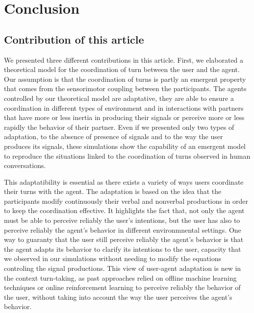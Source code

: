 \section{Conclusion}

\subsection{Contribution of this article}

We presented three different contributions in this article. First, we elaborated a theoretical model for the coordination of turn between the user and the agent. Our assumption is that the coordination of turns is partly an emergent property that comes from the sensorimotor coupling between the participants. 
The agents controlled by our theoretical model are adaptative, they are able to ensure a coordination in different types of environment and in interactions with partners that have more or less inertia in producing their signals or perceive more or less rapidly the behavior of their partner. Even if we presented only two types of adaptation, to the absence of presence of signals and to the way the user produces its signals, these simulations show the capability of an emergent model to reproduce the situations linked to the coordination of turns observed in human conversations.

This adaptatibility is essential as there exists a variety of ways users coordinate their turns with the agent. The adaptation is based on the idea that the participants modify continuously their verbal and nonverbal productions in order to keep the coordination effective. It highlights the fact that, not only the agent must be able to perceive reliably the user's intentions, but the user has also to perceive reliably the agent's behavior in different environmnental settings. One way to guaranty that the user still perceive reliably the agent's behavior is that the agent adapts its behavior to clarify its intentions to the user, capacity that we observed in our simulations without needing to modify the equations controling the signal productions. This view of user-agent adaptation is new in the context turn-taking, as past approaches relied on offline machine learning techniques or online reinforcement learning to perceive reliably the behavior of the user, without taking into account the way the user perceives the agent's behavior. 

